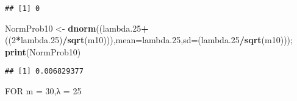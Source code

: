 \documentclass[
]{article}
\newenvironment{Shaded}{\begin{snugshade}}{\end{snugshade}}
\newcommand{\DataTypeTok}[1]{\textcolor[rgb]{0.13,0.29,0.53}{#1}}
\newcommand{\DecValTok}[1]{\textcolor[rgb]{0.00,0.00,0.81}{#1}}
\newcommand{\FloatTok}[1]{\textcolor[rgb]{0.00,0.00,0.81}{#1}}
\newcommand{\KeywordTok}[1]{\textcolor[rgb]{0.13,0.29,0.53}{\textbf{#1}}}
\newcommand{\NormalTok}[1]{#1}
\newcommand{\OperatorTok}[1]{\textcolor[rgb]{0.81,0.36,0.00}{\textbf{#1}}}
\newcommand{\StringTok}[1]{\textcolor[rgb]{0.31,0.60,0.02}{#1}}
\begin{document}
\begin{verbatim}
## [1] 0
\end{verbatim}

\begin{Shaded}
\begin{Highlighting}[]
\NormalTok{NormProb10 <-}\StringTok{ }\KeywordTok{dnorm}\NormalTok{((lambda}\FloatTok{.25}\OperatorTok{+}\NormalTok{((}\DecValTok{2}\OperatorTok{*}\NormalTok{lambda}\FloatTok{.25}\NormalTok{)}\OperatorTok{/}\KeywordTok{sqrt}\NormalTok{(m10))),}\DataTypeTok{mean=}\NormalTok{lambda}\FloatTok{.25}\NormalTok{,}\DataTypeTok{sd=}\NormalTok{(lambda}\FloatTok{.25}\OperatorTok{/}\KeywordTok{sqrt}\NormalTok{(m10))); }\KeywordTok{print}\NormalTok{(NormProb10)}
\end{Highlighting}
\end{Shaded}

\begin{verbatim}
## [1] 0.006829377
\end{verbatim}

FOR m = 30,λ = 25
\end{document}

